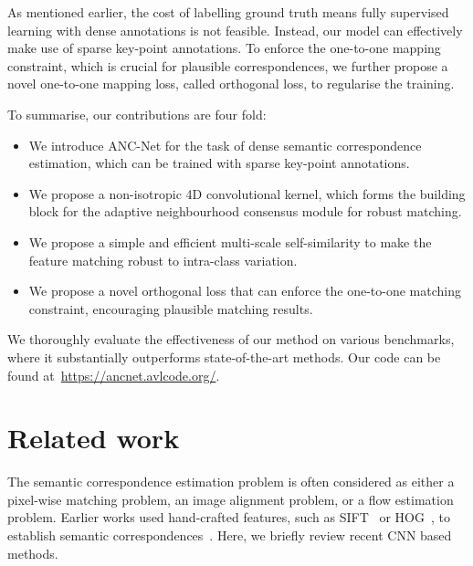 \documentclass[10pt,twocolumn,letterpaper]{article}
\begin{document}
As mentioned earlier, the cost of labelling ground truth means fully supervised learning with dense annotations is not feasible.
Instead, our model can effectively make use of sparse key-point annotations. To enforce the one-to-one mapping constraint, which is crucial for plausible correspondences, we further propose a novel one-to-one mapping loss, called orthogonal loss, to regularise the training.

To summarise, our contributions are four fold:
\begin{itemize}[noitemsep]
    \item We introduce ANC-Net for the task of dense semantic correspondence estimation, which can be trained with sparse key-point annotations.
    \item We propose a non-isotropic 4D convolutional kernel, which forms the building block for the adaptive neighbourhood consensus module for robust matching. 
    \item We propose a simple and efficient multi-scale self-similarity to make the feature matching robust to intra-class variation. 
    \item We propose a novel orthogonal loss that can enforce the one-to-one matching constraint, encouraging plausible matching results.
\end{itemize}
We thoroughly evaluate the effectiveness of our method on various benchmarks, where it substantially outperforms state-of-the-art methods. 
Our code can be found at~\url{https://ancnet.avlcode.org/}. 
 \section{Related work}

The semantic correspondence estimation problem is often considered as either a pixel-wise matching problem, an image alignment problem, or a flow estimation problem.
Earlier works used hand-crafted features, such as SIFT~\cite{Lowe2004SIFT} or HOG~\cite{Dalal05HOG}, to establish semantic correspondences~\cite{Liu_PAMI11_SIFT,Kim2013dsp,hur2015generalized,ham2018proposal_flow,Ham16PF,taniai2016joint}.
Here, we briefly review recent CNN based methods. 
\end{document}
